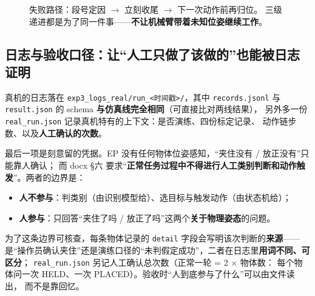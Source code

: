 \documentclass[12pt,a4paper]{ctexart}
\begin{document}
\begin{figure}[htbp]
  \centering
  \caption{失败路径：段号定因 $\to$ 立刻收尾 $\to$ 下一次动作前再归位。
  三级递进都是为了同一件事——\textbf{不让机械臂带着未知位姿继续工作}。}
  \label{fig:fail}
\end{figure}

\subsection{日志与验收口径：让“人工只做了该做的”也能被日志证明}

真机的日志落在 \texttt{exp3\_logs\_real/run\_<时间戳>/}，其中 \texttt{records.jsonl} 与
\texttt{result.json} 的 schema \textbf{与仿真线完全相同}（可直接比对两线结果），
另外多一份 \texttt{real\_run.json} 记录真机特有的上下文：是否演练、四份标定记录、
动作链步数、以及\textbf{人工确认的次数}。

最后一项是刻意留的凭据。EP 没有任何物体位姿感知，“夹住没有 / 放正没有”只能靠人确认；
而 docx §六 要求“\textbf{正常任务过程中不得进行人工类别判断和动作触发}”。两者的边界是：

\begin{itemize}[leftmargin=1.6em]
  \item \textbf{人不参与}：判类别（由识别模型给）、选目标与触发动作（由状态机给）；
  \item \textbf{人参与}：只回答“夹住了吗 / 放正了吗”这两个\textbf{关于物理姿态}的问题。
\end{itemize}

为了这条边界可核查，每条物体记录的 \texttt{detail} 字段会写明该次判断的\textbf{来源}——
是“操作员确认夹住”还是演练口径的“未判假定成功”，二者在日志里\textbf{用词不同、可区分}；
\texttt{real\_run.json} 另记人工确认总次数（正常一轮 = 2 $\times$ 物体数：
每个物体问一次 HELD、一次 PLACED）。验收时“人到底参与了什么”可以由文件读出，
而不是靠回忆。
\end{document}
